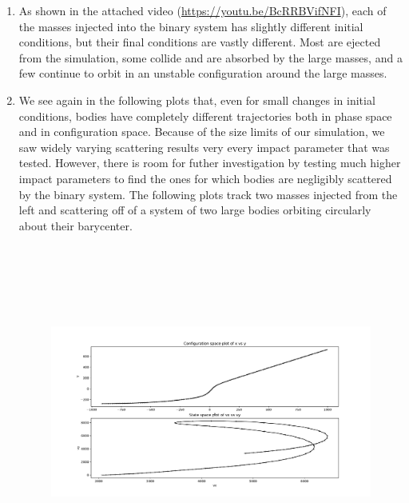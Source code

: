 \documentclass[cm, 10pt]{article}
\begin{document}
\begin{enumerate}
  \item As shown in the attached video
    (\url{https://youtu.be/BcRRBVifNFI}), each of the masses injected
    into the binary system has slightly different initial conditions,
    but their final conditions are vastly different. Most are ejected
    from the simulation, some collide and are absorbed by the large
    masses, and a few continue to orbit in an unstable configuration
    around the large masses.
  \item We see again in the following plots that, even for small
    changes in initial conditions, bodies have completely different
    trajectories both in phase space and in configuration space.
    Because of the size limits of our simulation, we saw widely
    varying scattering results very every impact parameter that was
    tested. However, there is room for futher investigation by testing
    much higher impact parameters to find the ones for which bodies
    are negligibly scattered by the binary system.
    \newline
    The following plots track two masses injected from the left and
    scattering off of a system of two large bodies orbiting circularly
    about their barycenter.
    \begin{figure}[H]
      \centering
      \begin{minipage}{.49\linewidth}
        \includegraphics[width=\linewidth, height = 11cm]{m1space.pdf}
      \end{minipage}
      \begin{minipage}{.49\linewidth}

\end{minipage}
\end{figure}
\end{enumerate}
\end{document}
